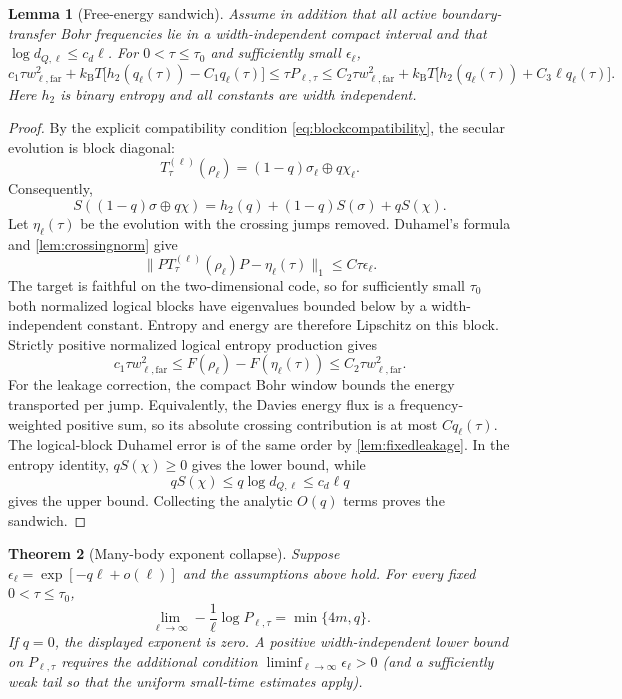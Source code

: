 \documentclass[11pt,a4paper]{article}
\newtheorem{theorem}{Theorem}[section]
\newtheorem{lemma}[theorem]{Lemma}
\theoremstyle{remark}
\begin{document}
\begin{lemma}[Free-energy sandwich]\label{lem:Fsandwich}
Assume in addition that all active boundary-transfer Bohr frequencies lie in a width-independent compact interval and that $\log d_{Q,\ell}\le c_d\ell$.  For $0<\tau\le\tau_0$ and sufficiently small $\epsilon_\ell$,
\[
 c_1\tau w_{\ell,\mathrm{far}}^2
 +k_{\mathrm B}T\bigl[h_2(q_\ell(\tau))-C_1q_\ell(\tau)\bigr]
 \le \tau P_{\ell,\tau}
 \le
 C_2\tau w_{\ell,\mathrm{far}}^2
 +k_{\mathrm B}T\bigl[h_2(q_\ell(\tau))+C_3\ell q_\ell(\tau)\bigr].
\]
Here $h_2$ is binary entropy and all constants are width independent.
\end{lemma}

\begin{proof}
By the explicit compatibility condition \eqref{eq:blockcompatibility}, the secular evolution is block diagonal:
\[
 T_\tau^{(\ell)}(\rho_\ell)
 =(1-q)\sigma_\ell\oplus q\chi_\ell.
\]
Consequently,
\[
 S((1-q)\sigma\oplus q\chi)=h_2(q)+(1-q)S(\sigma)+qS(\chi).
\]
Let $\eta_\ell(\tau)$ be the evolution with the crossing jumps removed.  Duhamel's formula and \cref{lem:crossingnorm} give
\[
 \|P T_\tau^{(\ell)}(\rho_\ell)P-\eta_\ell(\tau)\|_1
 \le C\tau\epsilon_\ell.
\]
The target is faithful on the two-dimensional code, so for sufficiently small $\tau_0$ both normalized logical blocks have eigenvalues bounded below by a width-independent constant.  Entropy and energy are therefore Lipschitz on this block.  Strictly positive normalized logical entropy production gives
\[
 c_1\tau w_{\ell,\mathrm{far}}^2
 \le F(\rho_\ell)-F(\eta_\ell(\tau))
 \le C_2\tau w_{\ell,\mathrm{far}}^2.
\]
For the leakage correction, the compact Bohr window bounds the energy transported per jump.  Equivalently, the Davies energy flux is a frequency-weighted positive sum, so its absolute crossing contribution is at most $Cq_\ell(\tau)$.  The logical-block Duhamel error is of the same order by \cref{lem:fixedleakage}.  In the entropy identity, $qS(\chi)\ge0$ gives the lower bound, while
\[
 qS(\chi)\le q\log d_{Q,\ell}\le c_d\ell q
\]
gives the upper bound.  Collecting the analytic $O(q)$ terms proves the sandwich.
\end{proof}

\begin{theorem}[Many-body exponent collapse]\label{thm:powerexponent}
Suppose $\epsilon_\ell=\exp[-q\ell+o(\ell)]$ and the assumptions above hold.  For every fixed $0<\tau\le\tau_0$,
\[
 \boxed{
 \lim_{\ell\to\infty}-\frac1\ell\log P_{\ell,\tau}
 =\min\{4m,q\}.}
\]
If $q=0$, the displayed exponent is zero.  A positive width-independent lower bound on $P_{\ell,\tau}$ requires the additional condition $\liminf_{\ell\to\infty}\epsilon_\ell>0$ (and a sufficiently weak tail so that the uniform small-time estimates apply).
\end{theorem}
\end{document}
